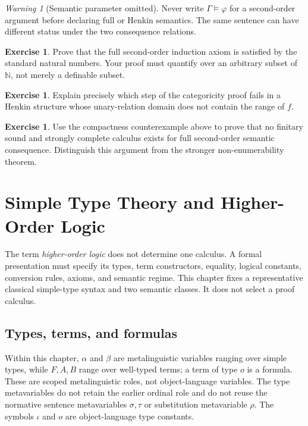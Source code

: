 \documentclass[11pt,oneside,openany]{book}
\theoremstyle{definition}
\newtheorem{exercise}[definition]{Exercise}
\theoremstyle{plain}
\theoremstyle{remark}
\newtheorem{warning}[definition]{Warning}
\newcommand{\N}{\mathbb{N}}
\newcommand{\entails}{\models}
\begin{document}
\begin{warning}[Semantic parameter omitted]
Never write \(\Gamma\entails\varphi\) for a second-order argument before
declaring full or Henkin semantics.  The same sentence can have different
status under the two consequence relations.
\end{warning}

\begin{exercise}
\label{ex:second-order-logic-01}
Prove that the full second-order induction axiom is satisfied by the standard
natural numbers.  Your proof must quantify over an arbitrary subset of
\(\N\), not merely a definable subset.
\end{exercise}

\begin{exercise}
\label{ex:second-order-logic-02}
Explain precisely which step of the categoricity proof fails in a Henkin
structure whose unary-relation domain does not contain the range of \(f\).
\end{exercise}

\begin{exercise}
\label{ex:second-order-logic-03}
Use the compactness counterexample above to prove that no finitary sound and
strongly complete calculus exists for full second-order semantic consequence.
Distinguish this argument from the stronger non-enumerability theorem.
\end{exercise}

\chapter[Simple Type Theory]{Simple Type Theory and Higher-Order Logic}
\label{ch:simple-type-theory}

The term \emph{higher-order logic} does not determine one calculus.  A formal
presentation must specify its types, term constructors, equality, logical
constants, conversion rules, axioms, and semantic regime.  This chapter fixes
a representative classical simple-type syntax and two semantic classes.  It
does not select a proof calculus.

\section{Types, terms, and formulas}
\label{sec:simple-type-theory-01}

Within this chapter, \(\alpha\) and \(\beta\) are metalinguistic variables
ranging over simple types, while \(F,A,B\) range over well-typed terms; a term
of type \(o\) is a formula.  These are scoped metalinguistic roles, not
object-language variables.  The type metavariables do not retain the earlier
ordinal role and do not reuse the normative sentence metavariables
\(\sigma,\tau\) or substitution metavariable \(\rho\).  The symbols \(\iota\)
and \(o\) are object-language type constants.
\end{document}
